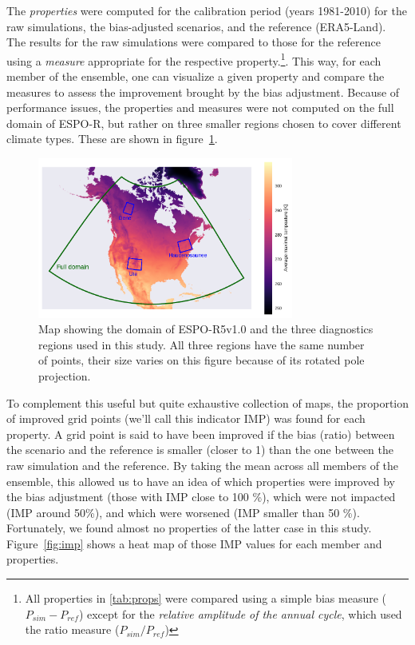 \documentclass[letterpaper,10pt]{article}
\begin{document}
The \emph{properties} were computed for the calibration period (years 1981-2010) for the raw simulations, the bias-adjusted scenarios, and the reference (ERA5-Land).
The results for the raw simulations were compared to those for the reference using a \emph{measure} appropriate for the respective property.\footnote{All properties in \ref{tab:props} were compared using a simple bias measure ($P_{sim} - P_{ref}$) except for the \emph{relative amplitude of the annual cycle}, which used the ratio measure ($P_{sim} / P_{ref}$)}. This way, for each member of the ensemble, one can visualize a given property and compare the measures to assess the improvement brought by the bias adjustment. Because of performance issues, the properties and measures were not computed on the full domain of ESPO-R, but rather on three smaller regions chosen to cover different climate types. These are shown in figure~\ref{fig:map}.

\begin{figure}
    \centering
    \includegraphics[width=0.75\textwidth]{../images/regions_domain_map.pdf}
    \caption{Map showing the domain of ESPO-R5v1.0 and the three diagnostics regions used in this study. All three regions have the same number of points, their size varies on this figure because of its rotated pole projection.}\label{fig:map}
\end{figure}

To complement this useful but quite exhaustive collection of maps, the proportion of improved grid points (we'll call this indicator IMP) was found for each property.
A grid point is said to have been improved if the bias (ratio) between the scenario and the reference is smaller (closer to 1) than the one between the raw simulation and the reference.
By taking the mean across all members of the ensemble, this allowed us to have an idea of which properties were improved by the bias adjustment (those with IMP close to 100 \%), which were not impacted (IMP around 50\%), and which were worsened (IMP smaller than 50 \%).
Fortunately, we found almost no properties of the latter case in this study. Figure~\ref{fig:imp} shows a heat map of those IMP values for each member and properties.
\end{document}
